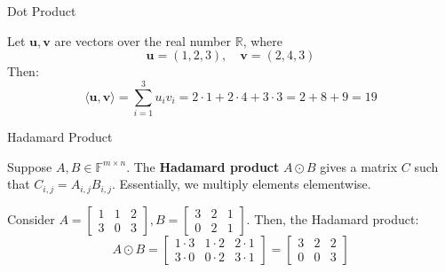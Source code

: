 \documentclass{zkdl-presentation-template}
\begin{document}
    \begin{frame}{Dot Product}
        \begin{example}
            Let $\mathbf{u}, \mathbf{v}$ are vectors over the real number $\mathbb{R}$, where
            \begin{equation*}
                \mathbf{u} = (1, 2, 3), \quad \mathbf{v} = (2, 4, 3)
            \end{equation*}
            Then: 
            \begin{equation*}
                \langle \mathbf{u}, \mathbf{v}\rangle = \sum_{i=1}^{3}u_iv_i = 2 \cdot 1 + 2 \cdot 4 + 3 \cdot 3 = 2 + 8 + 9 = 19
            \end{equation*}
        \end{example}
    \end{frame}

    \begin{frame}{Hadamard Product}
        \begin{definition}
            Suppose $A,B \in \mathbb{F}^{m \times n}$. The \textbf{Hadamard product} $A \odot B$ 
            gives a matrix $C$ such that $C_{i,j} = A_{i,j}B_{i,j}$. Essentially, we multiply 
            elements elementwise.
        \end{definition}
        
        \begin{example}
            Consider $A = \begin{bmatrix}
                1 & 1 & 2 \\
                3 & 0 & 3
            \end{bmatrix}, B = \begin{bmatrix}
                3 & 2 & 1 \\ 0 & 2 & 1
            \end{bmatrix}$. Then, the Hadamard product:
            \begin{equation*}
                A \odot B = \begin{bmatrix}
                    1 \cdot 3 & 1 \cdot 2 & 2 \cdot 1 \\
                    3 \cdot 0 & 0 \cdot 2 & 3 \cdot 1
                \end{bmatrix} = \begin{bmatrix}
                    3 & 2 & 2 \\
                    0 & 0 & 3
                \end{bmatrix}
            \end{equation*}
        \end{example}
    \end{frame}
\end{document}
